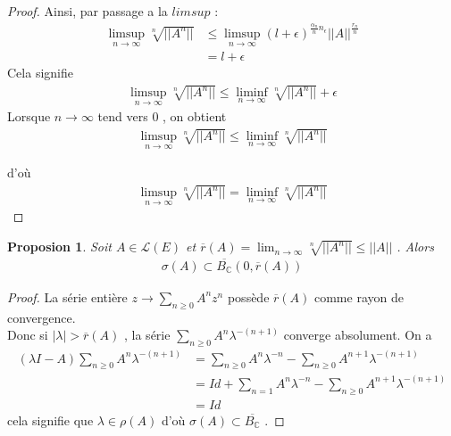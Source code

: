 \documentclass{report}
\newtheorem{Prop}{Proposion}[subsection]
\begin{document}
{\begin{proof}
Ainsi, par passage a la $lim sup$ : 
					\begin{align*}
						 \limsup_{n\to \infty} \sqrt[n]{||A^n||} &\le \limsup_{n\to \infty} (l + \epsilon)^{\frac{\alpha_n}{n} n_\epsilon} ||A||^{\frac{r_n}{n}} \\
						 &= l + \epsilon 
					\end{align*}
Cela signifie 
					\begin{align*}
						 \limsup_{n\to \infty} \sqrt[n]{||A^n||}  \le  \liminf_{n\to \infty} \sqrt[n]{||A^n||} + \epsilon 
					\end{align*}
Lorsque $n \to \infty$ tend vers $0$ , on obtient 
					\begin{align*}
						 \limsup_{n\to \infty} \sqrt[n]{||A^n||}  \le  \liminf_{n\to \infty} \sqrt[n]{||A^n||} 
					\end{align*}




d'où 
					\begin{align*}
						 \limsup_{n\to \infty} \sqrt[n]{||A^n||}  =  \liminf_{n\to \infty} \sqrt[n]{||A^n||} 
					\end{align*}
\end{proof}


\begin{Prop} \label{Prop:100} Soit $A \in \mathscr{L}(E)$ et $\overline{r}(A) = \lim_{n\to \infty} \sqrt[n]{||A^n||} \le ||A||$ . Alors 
					\begin{align*}
							 \sigma(A) \subset \overline{B_\mathbb{C}}(0, \overline{r}(A)) 
					\end{align*}
\end{Prop}
\begin{proof}
La série entière $z \rightarrow \sum_{n\ge 0} A^n z^n$ possède $\overline{r}(A)$ comme rayon de convergence. \\
Donc si $|\lambda| > \overline{r}(A)$ , la série $\sum_{n\ge 0} A^n \lambda^{-(n+1)}$ converge absolument. On a 
					\begin{align*}
							 (\lambda I - A) \sum_{n \ge 0} A^n \lambda^{-(n+1)} &= \sum_{n \ge 0} A^n \lambda^{-n} - \sum_{n \ge 0} A^{n+1} \lambda^{-(n+1)} \\
							 &= Id + \sum_{n=1}^{} A^n \lambda^{-n} - \sum_{n \ge 0} A^{n+1} \lambda^{-(n+1)} \\
							 &= Id 
					\end{align*}
cela signifie que $\lambda \in \rho(A)$ d'où $\sigma(A) \subset \overline{B_{\mathbb{C}}}$ . 
\end{proof}

}
\end{document}
